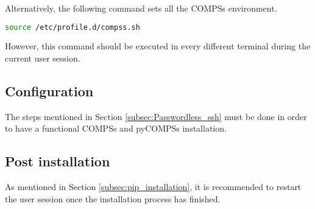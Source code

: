 Alternatively, the following command sets all the COMPSs environment.
\begin{lstlisting}[language=bash]
source /etc/profile.d/compss.sh
\end{lstlisting}
However, this command should be executed in every different terminal during the current user session.


\subsection{Configuration}
\label{subsec:pip_configuration}
The steps mentioned in Section \ref{subsec:Passwordless_ssh} must be done in order to have a functional COMPSs and pyCOMPSs installation.


\subsection{Post installation}
As mentioned in Section \ref{subsec:pip_installation}, it is recommended to restart the user session once the installation process has finished.